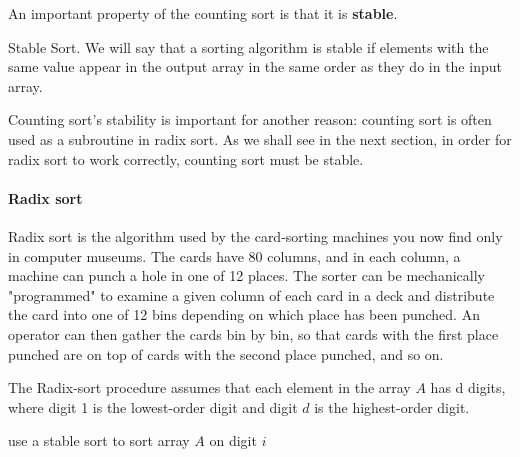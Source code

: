 An important property of the counting sort is that it is \textbf{stable}.

\begin{defbox}{Stable Sort.}
 We will say that a sorting algorithm is stable if elements with the same value appear in the output array in the same order as they do in the input array. \end{defbox}

Counting sort's stability is important for another reason: counting sort is often used as a subroutine in radix sort. As we shall see in the next section, in order for radix sort to work correctly, counting sort must be stable.


\paragraph{Radix sort}
 Radix sort is the algorithm used by the card-sorting machines you now find only in computer museums. The cards have 80 columns, and in each column, a machine can punch a hole in one of 12 places. The sorter can be mechanically "programmed" to examine a given column of each card in a deck and distribute the card into one of 12 bins depending on which place has been punched. An operator can then gather the cards bin by bin, so that cards with the first place punched are on top of cards with the second place punched, and so on.

The Radix-sort procedure assumes that each element in the array $A$ has d digits, where digit 1 is the lowest-order digit and digit $d$ is the highest-order digit.


  \begin{algorithm}
     {
        use a stable sort to sort array $A$ on digit $i$
    }
\caption{radix-sort($A$, $n$, $d$)}
  \end{algorithm}

